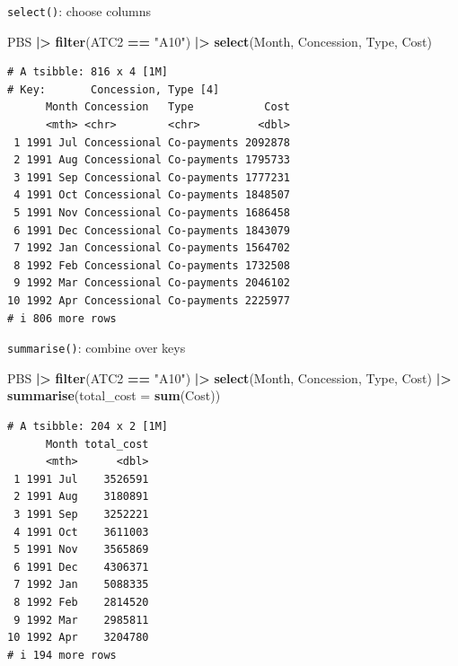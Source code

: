 \documentclass[
  14pt,
  ignorenonframetext,
  aspectratio=169,
]{beamer}
\newenvironment{Shaded}{\begin{snugshade}}{\end{snugshade}}
\newcommand{\AttributeTok}[1]{\textcolor[rgb]{0.13,0.29,0.53}{#1}}
\newcommand{\FunctionTok}[1]{\textcolor[rgb]{0.13,0.29,0.53}{\textbf{#1}}}
\newcommand{\NormalTok}[1]{#1}
\newcommand{\SpecialCharTok}[1]{\textcolor[rgb]{0.81,0.36,0.00}{\textbf{#1}}}
\newcommand{\StringTok}[1]{\textcolor[rgb]{0.31,0.60,0.02}{#1}}
\renewenvironment{Shaded}{\vspace*{0.15cm}\color{black}\fontsize{10}{10}\sf\begin{snugshade}\color{black}}{\end{snugshade}}
\begin{document}
\begin{frame}[fragile]{\texttt{select()}: choose columns}
\protect{}\label{select-choose-columns}
\fontsize{8}{10}\sf

\begin{Shaded}
\begin{Highlighting}[]
\NormalTok{PBS }\SpecialCharTok{|\textgreater{}}
  \FunctionTok{filter}\NormalTok{(ATC2 }\SpecialCharTok{==} \StringTok{"A10"}\NormalTok{) }\SpecialCharTok{|\textgreater{}}
  \FunctionTok{select}\NormalTok{(Month, Concession, Type, Cost)}
\end{Highlighting}
\end{Shaded}

\begin{verbatim}
# A tsibble: 816 x 4 [1M]
# Key:       Concession, Type [4]
      Month Concession   Type           Cost
      <mth> <chr>        <chr>         <dbl>
 1 1991 Jul Concessional Co-payments 2092878
 2 1991 Aug Concessional Co-payments 1795733
 3 1991 Sep Concessional Co-payments 1777231
 4 1991 Oct Concessional Co-payments 1848507
 5 1991 Nov Concessional Co-payments 1686458
 6 1991 Dec Concessional Co-payments 1843079
 7 1992 Jan Concessional Co-payments 1564702
 8 1992 Feb Concessional Co-payments 1732508
 9 1992 Mar Concessional Co-payments 2046102
10 1992 Apr Concessional Co-payments 2225977
# i 806 more rows
\end{verbatim}
\end{frame}

\begin{frame}[fragile]{\texttt{summarise()}: combine over keys}
\protect{}\label{summarise-combine-over-keys}
\fontsize{8}{10}\sf

\begin{Shaded}
\begin{Highlighting}[]
\NormalTok{PBS }\SpecialCharTok{|\textgreater{}}
  \FunctionTok{filter}\NormalTok{(ATC2 }\SpecialCharTok{==} \StringTok{"A10"}\NormalTok{) }\SpecialCharTok{|\textgreater{}}
  \FunctionTok{select}\NormalTok{(Month, Concession, Type, Cost) }\SpecialCharTok{|\textgreater{}}
  \FunctionTok{summarise}\NormalTok{(}\AttributeTok{total\_cost =} \FunctionTok{sum}\NormalTok{(Cost))}
\end{Highlighting}
\end{Shaded}

\begin{verbatim}
# A tsibble: 204 x 2 [1M]
      Month total_cost
      <mth>      <dbl>
 1 1991 Jul    3526591
 2 1991 Aug    3180891
 3 1991 Sep    3252221
 4 1991 Oct    3611003
 5 1991 Nov    3565869
 6 1991 Dec    4306371
 7 1992 Jan    5088335
 8 1992 Feb    2814520
 9 1992 Mar    2985811
10 1992 Apr    3204780
# i 194 more rows
\end{verbatim}
\end{frame}
\end{document}
